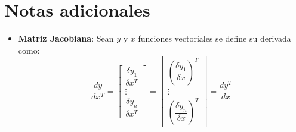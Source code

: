 \documentclass[pdftex,11pt,a4paper]{article}
\begin{document}
\section{Notas adicionales}
\begin{itemize}
	\item \textbf{Matriz Jacobiana}: Sean $y$ y $x$ funciones vectoriales se define su derivada como:
	$$\dfrac{dy}{dx^T} = \begin{bmatrix}
	\dfrac{\delta y_1}{\delta x^T}\\
	\vdots\\
	\dfrac{\delta y_n}{\delta x^T}
	\end{bmatrix} = 
	\begin{bmatrix}
	\left(\dfrac{\delta y_1}{\delta x}\right)^T\\
	\vdots\\
	\left(\dfrac{\delta y_n}{\delta x}\right)^T
	\end{bmatrix} = \dfrac{dy^T}{dx}$$
\end{itemize}
\end{document}
